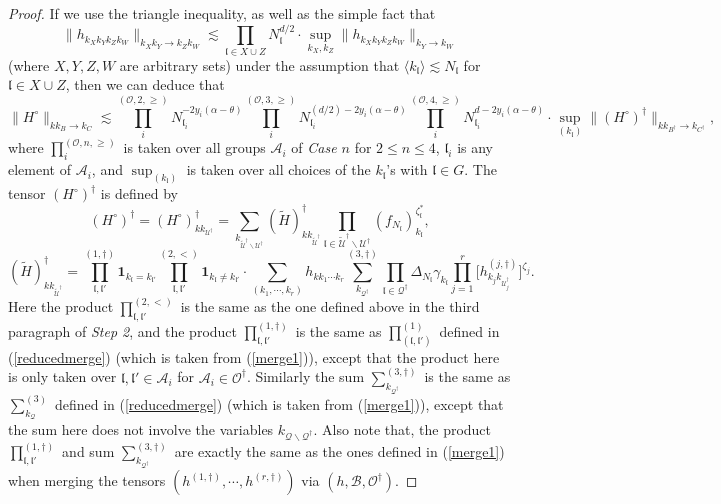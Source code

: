 \documentclass[11 pt,reqno]{amsart}
\theoremstyle{definition}
\theoremstyle{remark}
\numberwithin{equation}{section}
\newcommand{\Qc}{\mathcal{Q}}
\newcommand{\Uc}{\mathcal{U}}
\newcommand{\Ac}{\mathcal{A}}
\newcommand{\lf}{\mathfrak{l}}
\newcommand{\Bs}{\mathscr{B}}
\newcommand{\Os}{\mathscr{O}}
\begin{document}
{\begin{proof}
If we use the triangle inequality, as well as the simple fact  that
\[\|h_{k_Xk_Yk_Zk_W}\|_{k_Xk_Y\to k_Zk_W}\lesssim\prod_{\lf\in X\cup Z}N_\lf^{d/2}\cdot\sup_{k_X,k_Z}\|h_{k_Xk_Yk_Zk_W}\|_{k_Y\to k_W}\] (where $X,Y,Z,W$ are arbitrary sets) under the assumption that $\langle k_\lf\rangle\lesssim N_\lf$ for $\lf\in X\cup Z$, then we can deduce that
\begin{equation}\label{reducedest}\|H^\circ\|_{kk_B\to k_C}\lesssim\prod_{i}^{(\Os,2,\geq)}N_{\lf_i}^{-2y_i(\alpha-\theta)}\prod_i^{(\Os,3,\geq)}N_{\lf_i}^{(d/2)-2y_i(\alpha-\theta)}\prod_i^{(\Os,4,\geq)}N_{\lf_i}^{d-2y_i(\alpha-\theta)}\cdot\sup_{(k_\lf)}\|(H^\circ)^\dagger\|_{kk_{B^\dagger}\to k_{C^\dagger}},
\end{equation} where $\prod_i^{(\Os,n,\geq)}$ is taken over all groups $\Ac_i$ of \emph{Case $n$} for $2\leq n\leq 4$, $\lf_i$ is any element of $\Ac_i$, and $\sup_{(k_\lf)}$ is taken over all choices of the $k_\lf$'s  with $\lf\in G$. The tensor $(H^\circ)^\dagger$ is defined by
\begin{equation}\label{reducedtrim2}(H^\circ)^\dagger=(H^\circ)_{kk_{\Uc^\dagger}}^\dagger=\sum_{k_{\widetilde{\Uc}^\dagger\backslash\Uc^\dagger}}(\widetilde{H})_{kk_{\widetilde{\Uc}^\dagger}}^\dagger\prod_{\lf\in \widetilde{\Uc}^\dagger\backslash\Uc^\dagger}(f_{N_\lf})_{k_\lf}^{\zeta_\lf^*},
\end{equation}
\begin{equation}\label{reducedmerge2}(\widetilde{H})_{kk_{\widetilde{\Uc}^\dagger}}^\dagger=\prod_{\lf,\lf'}^{(1,\dagger)}\mathbf{1}_{k_\lf=k_{\lf'}}\prod_{\lf,\lf'}^{(2,<)}\mathbf{1}_{k_\lf\neq k_{\lf'}}\cdot\sum_{(k_1,\cdots,k_r)}h_{kk_1\cdots k_r}\sum_{k_{\Qc^\dagger}}^{(3,\dagger)}\prod_{\lf\in\Qc^\dagger}\Delta_{N_\lf}\gamma_{k_\lf}\prod_{j=1}^{r}\big[h_{k_jk_{\Uc_j^\dagger}}^{(j,\dagger)}\big]^{\zeta_j}.
\end{equation} Here the product $\prod_{\lf,\lf'}^{(2,<)}$ is the same as the one defined above in the third paragraph of \emph{Step 2}, and the product $\prod_{\lf,\lf'}^{(1,\dagger)}$ is the same as $\prod_{(\lf,\lf')}^{(1)}$ defined in (\ref{reducedmerge}) (which is taken from (\ref{merge1})), except that the product here is only taken over $\lf,\lf'\in\Ac_i$ for $\Ac_i\in\Os^\dagger$. Similarly the sum $\sum_{k_{\Qc^\dagger}}^{(3,\dagger)}$ is the same as $\sum_{k_\Qc}^{(3)}$ defined  in (\ref{reducedmerge}) (which is taken from (\ref{merge1})), except that the sum here does not involve the variables $k_{\Qc\backslash\Qc^\dagger}$. Also note that, the product $\prod_{\lf,\lf'}^{(1,\dagger)}$ and sum $\sum_{k_{\Qc^\dagger}}^{(3,\dagger)}$ are exactly the same as the ones defined in (\ref{merge1}) when merging the tensors $(h^{(1,\dagger)},\cdots, h^{(r,\dagger)})$ via $(h,\Bs,\Os^\dagger)$.


\end{proof}}
\end{document}
